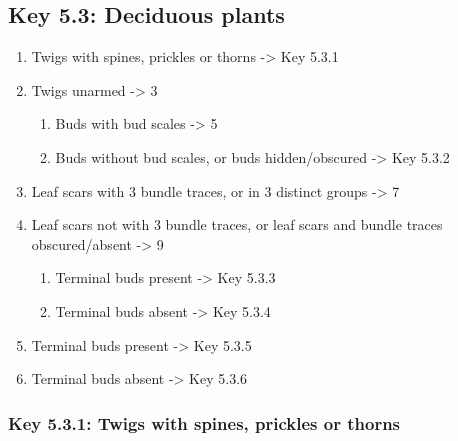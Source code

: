 \documentclass[openany]{book}
\providecommand{\tightlist}{%
  \setlength{\itemsep}{0pt}\setlength{\parskip}{0pt}}
\begin{document}
\hypertarget{key-5.3-deciduous-plants}{%
\subsection{Key 5.3: Deciduous plants}\label{key-5.3-deciduous-plants}}

\begin{enumerate}
\def\labelenumi{\arabic{enumi}.}
\tightlist
\item
  Twigs with spines, prickles or thorns -\textgreater{} Key 5.3.1
\item
  Twigs unarmed -\textgreater{} 3

  \begin{enumerate}
  \def\labelenumii{\arabic{enumii}.}
  \setcounter{enumii}{2}
  \tightlist
  \item
    Buds with bud scales -\textgreater{} 5
  \item
    Buds without bud scales, or buds hidden/obscured -\textgreater{} Key
    5.3.2
  \end{enumerate}
\item
  Leaf scars with 3 bundle traces, or in 3 distinct groups
  -\textgreater{} 7
\item
  Leaf scars not with 3 bundle traces, or leaf scars and bundle traces
  obscured/absent -\textgreater{} 9

  \begin{enumerate}
  \def\labelenumii{\arabic{enumii}.}
  \setcounter{enumii}{6}
  \tightlist
  \item
    Terminal buds present -\textgreater{} Key 5.3.3
  \item
    Terminal buds absent -\textgreater{} Key 5.3.4
  \end{enumerate}
\item
  Terminal buds present -\textgreater{} Key 5.3.5
\item
  Terminal buds absent -\textgreater{} Key 5.3.6
\end{enumerate}

\hypertarget{key-5.3.1-twigs-with-spines-prickles-or-thorns}{%
\subsubsection{Key 5.3.1: Twigs with spines, prickles or
thorns}\label{key-5.3.1-twigs-with-spines-prickles-or-thorns}}
\end{document}

